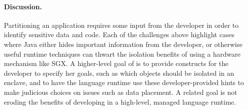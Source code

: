 
\paragraph{Discussion.}
Partitioning an application requires some input from the developer in order to identify 
sensitive data and code.  Each of the challenges above highlight cases where
Java either hides important information from the developer, or otherwise useful runtime
techniques can thwart the isolation benefits of using a hardware mechanism like SGX.
A higher-level goal of \systemname{} is to provide constructs for the developer to specify
her goals, such as which objects should be isolated in an enclave,
and to have the language runtime use these developer-provided hints to 
make judicious choices on issues such as data placement.
A related goal is not eroding the benefits of developing in a high-level, managed language runtime.


